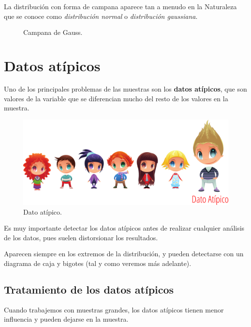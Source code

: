 \documentclass[
  a4paper,
]{scrreport}
\theoremstyle{plain}
\theoremstyle{definition}
\theoremstyle{definition}
\theoremstyle{remark}
\begin{document}
La distribución con forma de campana aparece tan a menudo en la
Naturaleza que se conoce como \emph{distribución normal} o
\emph{distribución gaussiana}.

\begin{figure}
\centering

\caption{Campana de Gauss.}
\end{figure}

\section{Datos atípicos}\label{datos-atuxedpicos}

Uno de los principales problemas de las muestras son los \textbf{datos
atípicos}, que son valores de la variable que se diferencian mucho del
resto de los valores en la muestra.

\begin{figure}[H]

{\centering \includegraphics{img/descriptiva/dato_atipico.png}

}

\caption{Dato atípico.}

\end{figure}%

Es muy importante detectar los datos atípicos antes de realizar
cualquier análisis de los datos, pues suelen distorsionar los
resultados.

Aparecen siempre en los extremos de la distribución, y pueden detectarse
con un diagrama de caja y bigotes (tal y como veremos más adelante).

\subsection{Tratamiento de los datos
atípicos}\label{tratamiento-de-los-datos-atuxedpicos}

Cuando trabajemos con muestras grandes, los datos atípicos tienen menor
influencia y pueden dejarse en la muestra.
\end{document}
